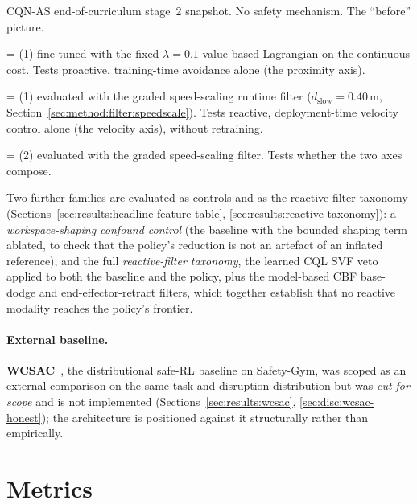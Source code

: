 \documentclass[11pt,a4paper]{report}
\newcommand{\cqnas}{CQN-AS}
\begin{document}
\begin{description}[leftmargin=2em,topsep=2pt,itemsep=1pt]
\item[(\textbf{1}) \emph{Unconstrained baseline}] \cqnas{}
  end-of-curriculum stage~2 snapshot. No safety mechanism. The
  ``before'' picture.
\item[(\textbf{2}) \emph{Proactive policy}] = (1) fine-tuned with the
  fixed-$\lambda = 0.1$ value-based Lagrangian on the continuous cost.
  Tests proactive, training-time avoidance alone (the proximity axis).
\item[(\textbf{3}) \emph{Speed-scaling filter on baseline}] = (1)
  evaluated with the graded speed-scaling runtime filter
  ($d_{\mathrm{slow}} = 0.40$\,m,
  Section~\ref{sec:method:filter:speedscale}). Tests reactive,
  deployment-time velocity control alone (the velocity axis), without
  retraining.
\item[(\textbf{4}) \emph{Composed hybrid}] = (2) evaluated with the
  graded speed-scaling filter. Tests whether the two axes compose.
\end{description}

Two further families are evaluated as controls and as the
reactive-filter taxonomy
(Sections~\ref{sec:results:headline-feature-table},
\ref{sec:results:reactive-taxonomy}): a \emph{workspace-shaping
confound control} (the baseline with the bounded shaping term ablated,
to check that the policy's reduction is not an artefact of an inflated
reference), and the full \emph{reactive-filter taxonomy}, the learned
\textsc{CQL} SVF veto applied to both the baseline and the policy, plus
the model-based CBF base-dodge and end-effector-retract filters, which
together establish that no reactive modality reaches the policy's
frontier.

\paragraph{External baseline.}
\textbf{WCSAC}~\cite{yang2021wcsac}, the distributional safe-RL
baseline on Safety-Gym, was scoped as an external comparison on the
same task and disruption distribution but was \emph{cut for scope} and
is not implemented (Sections~\ref{sec:results:wcsac},
\ref{sec:disc:wcsac-honest}); the architecture is positioned against
it structurally rather than empirically.

\section{Metrics}
\label{sec:setup:metrics}
\end{document}
